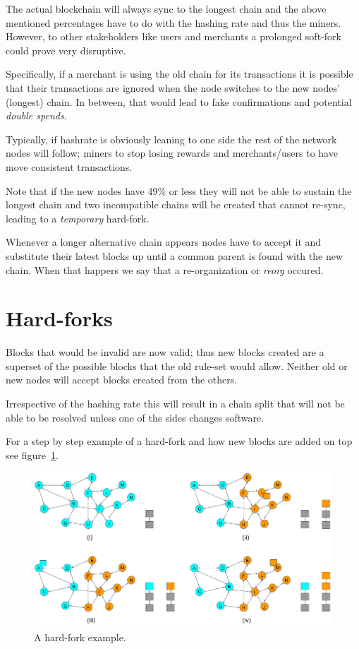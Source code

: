 The actual blockchain will always sync to the longest chain and the above mentioned percentages have to do with the hashing rate and thus the miners. However, to other stakeholders like users and merchants a prolonged soft-fork could prove very disruptive.

Specifically, if a merchant is using the old chain for its transactions it is possible that their transactions are ignored when the node switches to the new nodes’ (longest) chain. In between, that would lead to fake confirmations and potential \emph{double spends}.

Typically, if hashrate is obviously leaning to one side the rest of the network nodes will follow; miners to stop losing rewards and merchants/users to have move consistent transactions.

Note that if the new nodes have 49\% or less they will not be able to sustain the longest chain and two incompatible chains will be created that cannot re-sync, leading to a \emph{temporary} hard-fork.

\begin{note}
Whenever a longer alternative chain appears nodes have to accept it and substitute their latest blocks up until a common parent is found with the new chain. When that happers we say that a re-organization or \emph{reorg} occured.
\end{note}


\section{Hard-forks}
Blocks that would be invalid are now valid; thus new blocks created are a superset of the possible blocks that the old rule-set would allow. Neither old or new nodes will accept blocks created from the others.

Irrespective of the hashing rate this will result in a chain split that will not be able to be resolved unless one of the sides changes software.

For a step by step example of a hard-fork and how new blocks are added on top see figure~\ref{fig:hard-fork-example}.

\begin{figure}[h]
\begin{center}
\includegraphics[scale=0.4]{images/hard-fork-example}
\caption{A hard-fork example.}
\label{fig:hard-fork-example}
\end{center}
\end{figure}

